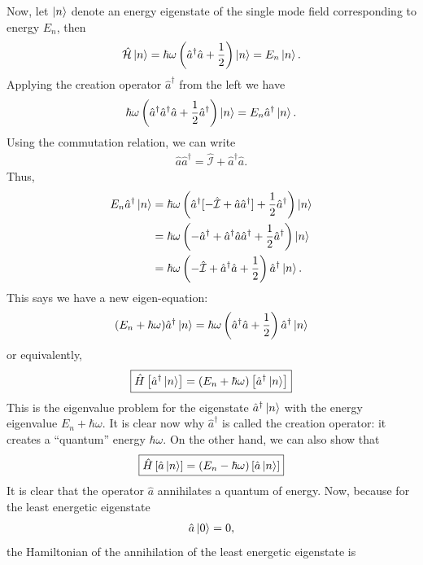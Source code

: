 \documentclass{book}
\theoremstyle{definition}
\newcommand{\ham}{\mathcal{H}}
\newcommand{\f}[2]{\frac{#1}{#2}}
\newcommand{\lp}{\left(}
\newcommand{\rp}{\right)}
\newcommand{\lb}{\left[}
\newcommand{\rb}{\right]}
\newcommand{\Id}{\mathcal{I}}
\begin{document}
Now, let $\ket{n}$ denote an energy eigenstate of the single mode field corresponding to energy $E_n$, then 
\begin{align}
\hat{\ham}\ket{n} = \hbar\omega\lp \hat{a}^\dagger\hat{a} + \f{1}{2} \rp\ket{n} = E_n\ket{n}.
\end{align}
Applying the creation operator $\hat{a}^\dagger$ from the left we have
\begin{align}
\hbar\omega\lp \hat{a}^\dagger\hat{a}^\dagger\hat{a} + \f{1}{2}\hat{a}^\dagger \rp\ket{n} = E_n\hat{a}^\dagger\ket{n}.
\end{align}
Using the commutation relation, we can write 
\begin{align}
\hat{a}\hat{a}^\dagger = \hat{\Id} + \hat{a}^\dagger\hat{a}.
\end{align}
Thus,
\begin{align}
E_n\hat{a}^\dagger\ket{n} &= \hbar\omega\lp \hat{a}^\dagger[-\hat{\Id} + \hat{a}\hat{a}^\dagger] + \f{1}{2}\hat{a}^\dagger \rp\ket{n}\\
&= \hbar\omega\lp -\hat{a}^\dagger + \hat{a}^\dagger\hat{a}\hat{a}^\dagger + \f{1}{2}\hat{a}^\dagger \rp\ket{n}\\
&= \hbar\omega\lp -\hat{\Id} + \hat{a}^\dagger\hat{a} + \f{1}{2}  \rp\hat{a}^\dagger\ket{n}.
\end{align}
This says we have a new eigen-equation:
\begin{align}
(E_n + \hbar\omega) \hat{a}^\dagger\ket{n} = \hbar\omega\lp \hat{a}^\dagger\hat{a} + \f{1}{2} \rp\hat{a}^\dagger\ket{n}
\end{align}
or equivalently,
\begin{align}
\boxed{\hat{H}\lb\hat{a}^\dagger\ket{n}\rb = (E_n + \hbar\omega)\lb\hat{a}^\dagger\ket{n}\rb}
\end{align}
This is the eigenvalue problem for the eigenstate $\hat{a}^\dagger\ket{n}$ with the energy eigenvalue $E_n + \hbar\omega$. It is clear now why $\hat{a}^\dagger$ is called the creation operator: it creates a ``quantum'' energy $\hbar\omega$. On the other hand, we can also show that
\begin{align}
\boxed{\hat{H}\lb\hat{a}\ket{n}\rb = (E_n - \hbar\omega)\lb\hat{a}\ket{n}\rb} 
\end{align}
It is clear that the operator $\hat{a}$ annihilates a quantum of energy. Now, because for the least energetic eigenstate
\begin{align}
\hat{a}\ket{0} = 0,
\end{align}
the Hamiltonian of the annihilation of the least energetic eigenstate is 
\end{document}
